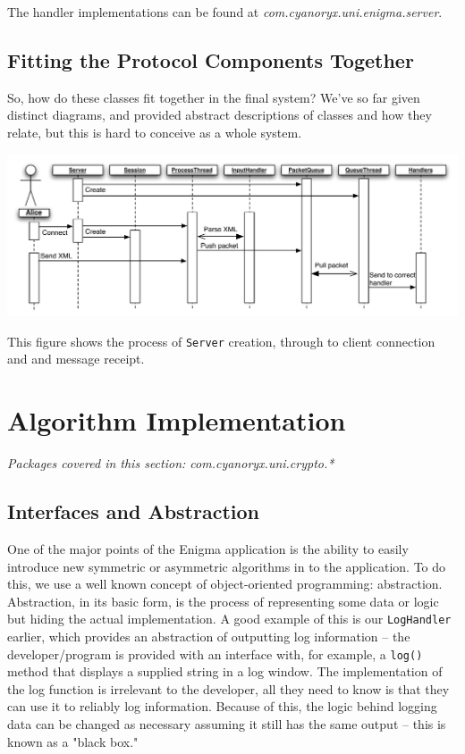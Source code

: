     The handler implementations can be found at \emph{com.cyanoryx.uni.enigma.server}.
    
    \subsection{Fitting the Protocol Components Together}
    \label{subsec:combined}
    
    So, how do these classes fit together in the final system? We've so far given distinct diagrams, and provided abstract descriptions of classes and how they relate, but this is hard to conceive as a whole system.
    
    \begin{center}
      \includegraphics[scale=0.5]{./Figures/Ch6/6-4-5.pdf}
    \end{center}
    
    This figure shows the process of \verb!Server! creation, through to client connection and and message receipt.

\section{Algorithm Implementation}
  \emph{Packages covered in this section: com.cyanoryx.uni.crypto.*}
  
  \subsection{Interfaces and Abstraction}
  
  One of the major points of the Enigma application is the ability to easily introduce new symmetric or asymmetric algorithms in to the application. To do this, we use a well known concept of object-oriented programming: abstraction. Abstraction, in its basic form, is the process of representing some data or logic but hiding the actual implementation. A good example of this is our \verb!LogHandler! earlier, which provides an abstraction of outputting log information -- the developer/program is provided with an interface with, for example, a \verb!log()! method that displays a supplied string in a log window. The implementation of the log function is irrelevant to the developer, all they need to know is that they can use it to reliably log information. Because of this, the logic behind logging data can be changed as necessary assuming it still has the same output -- this is known as a "black box."
  
